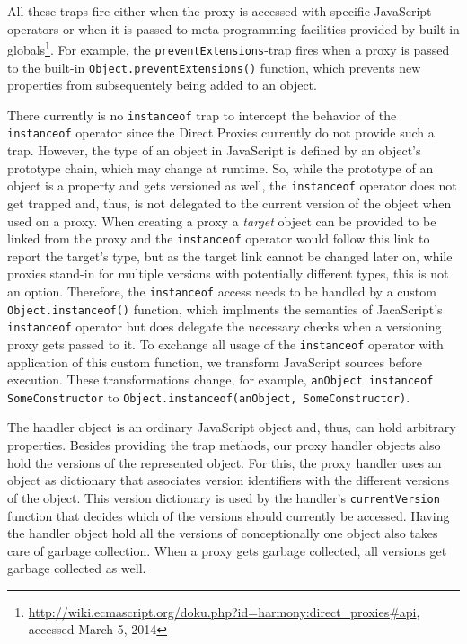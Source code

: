 All these traps fire either when the proxy is accessed with specific JavaScript operators or when it is passed to meta-programming facilities provided by built-in globals\footnote{\url{http://wiki.ecmascript.org/doku.php?id=harmony:direct_proxies\#api}, accessed March 5, 2014}.
For example, the \lstinline{preventExtensions}-trap fires when a proxy is passed to the built-in \lstinline{Object.preventExtensions()} function, which prevents new properties from subsequentely being added to an object.

There currently is no \lstinline{instanceof} trap to intercept the behavior of the \lstinline{instanceof} operator since the Direct Proxies currently do not provide such a trap.
However, the type of an object in JavaScript is defined by an object's prototype chain, which may change at runtime.
So, while the prototype of an object is a property and gets versioned as well, the \lstinline{instanceof} operator does not get trapped and, thus, is not delegated to the current version of the object when used on a proxy.
When creating a proxy a \emph{target} object can be provided to be linked from the proxy and the \lstinline{instanceof} operator would follow this link to report the target's type, but as the target link cannot be changed later on, while proxies stand-in for multiple versions with potentially different types, this is not an option.
Therefore, the \lstinline{instanceof} access needs to be handled by a custom \lstinline{Object.instanceof()} function, which implments the semantics of JacaScript's \lstinline{instanceof} operator but does delegate the necessary checks when a versioning proxy gets passed to it.
To exchange all usage of the \lstinline{instanceof} operator with application of this custom function, we transform JavaScript sources before execution.
These transformations change, for example, \lstinline{anObject instanceof SomeConstructor} to \lstinline{Object.instanceof(anObject, SomeConstructor)}.

The handler object is an ordinary JavaScript object and, thus, can hold arbitrary properties.
Besides providing the trap methods, our proxy handler objects also hold the versions of the represented object.
For this, the proxy handler uses an object as dictionary that associates version identifiers with the different versions of the object.
This version dictionary is used by the handler's \lstinline{currentVersion} function that decides which of the versions should currently be accessed.
Having the handler object hold all the versions of conceptionally one object also takes care of garbage collection.
When a proxy gets garbage collected, all versions get garbage collected as well.

